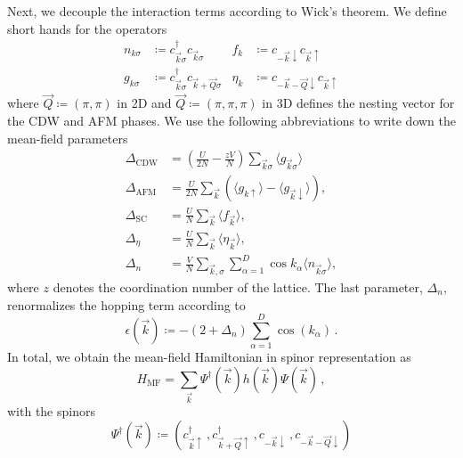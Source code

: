 \documentclass[
    reprint, 
    aps,
    preprintnumbers,
    twocolumn,
    prb,
    superscriptaddress
]{revtex4-2}
\newcommand{\vk}{\vec{k}}
\newcommand{\vQ}{\vec{Q}}
\newcommand{\up}{\uparrow}
\newcommand{\down}{\downarrow}
\newcommand{\kplusQ}{\vk+\vQ}
\newcommand{\kminusQ}{-\vk-\vQ}
\newcommand{\bs}{\begin{subequations}}
\newcommand{\es}{\end{subequations}}
\begin{document}
Next, we decouple the interaction terms according to Wick's theorem.
We define short hands for the operators
\bs
\begin{align}
    \label{eqn:operators}
        n_{k\sigma} &\coloneqq  c_{\vk\sigma}^\dagger c_{\vk\sigma}      &f_k     &\coloneqq  c_{-\vk\down} c_{\vk\up} \\
        g_{k\sigma} &\coloneqq  c_{\vk\sigma}^\dagger c_{\vk+\vQ\sigma}  &\eta_k  &\coloneqq  c_{-\vk-\vQ\down} c_{\vk\up}
\end{align}
\es
where $\vQ \coloneqq  (\pi, \pi)$ in 2D and $\vQ \coloneqq  (\pi, \pi,\pi)$ in 3D
defines the nesting vector for the CDW and AFM phases. We use the following abbreviations to write down the mean-field parameters
\begin{subequations}
    \begin{align}
        \label{eqn:delta_cdw}
        \Delta_\text{CDW} &= \left(\frac{U}{2N} - 
				\frac{zV}{N}\right) \sum_{\vk\sigma} \langle g_{\vk\sigma} \rangle \\
        \label{eqn:delta_afm}
        \Delta_\text{AFM} &= \frac{U}{2N} \sum_{\vk} \left( \langle g_{k\uparrow} \rangle - \langle g_{\vk\downarrow} \rangle \right), \\
        \Delta_\text{SC} &= \frac{U}{N} \sum_{\vk} \langle f_{\vk} \rangle, \\
        \Delta_\eta &= \frac{U}{N} \sum_{\vk} \langle \eta_{\vk} \rangle, \\
        \Delta_n &= \frac{V}{N} \sum_{\vk,\sigma} \sum_{\alpha=1}^D \cos k_\alpha \langle n_{\vk\sigma} \rangle,
    \end{align}
\end{subequations}
where $z$ denotes the coordination number of the lattice.
The last parameter, $\Delta_n$, renormalizes the hopping term according to 
\begin{equation}
    \epsilon( \vk ) \coloneqq  -(2 + \Delta_n) \sum_{\alpha=1}^D \cos(k_\alpha)\,.
\end{equation}
In total, we obtain the mean-field Hamiltonian in spinor representation as
\begin{equation}
    \label{eqn:mf_hamiltonian}
    H_\text{MF} = \sum_{\vk} \Psi^\dagger (\vk) h(\vk) \Psi (\vk)\,,
\end{equation}
with the spinors
\begin{equation}
    \Psi^\dagger (\vk) \coloneqq  \left( c_{\vk\up}^\dagger\,, c_{\kplusQ\up}^\dagger\,, c_{-\vk\down}\,, c_{\kminusQ\down} \right)
\end{equation}
\end{document}
